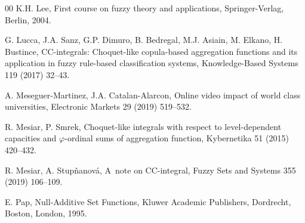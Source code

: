 \documentclass[preprint,11pt]{elsarticle}
\theoremstyle{definition}
\begin{document}
\begin{thebibliography}{00}
 K.H. Lee,  First course on fuzzy theory and applications,  Springer-Verlag, Berlin,  2004.


 G. Lucca, J.A. Sanz, G.P. Dimuro, B. Bedregal, M.J. Asiain, M. Elkano, H. Bustince,  CC-integrals: Choquet-like copula-based aggregation functions and its application in fuzzy rule-based classification systems, Knowledge-Based Systems 119 (2017) 32--43.

 A. Meseguer-Martinez, J.A. Catalan-Alarcon, Online video impact of world class universities, Electronic Markets 29 (2019) 519--532.

 R. Mesiar, P. Smrek, Choquet-like integrals with respect to level-dependent capacities and $\varphi$-ordinal sums of aggregation function, Kybernetika 51 (2015) 420--432.

 R. Mesiar, A. Stup\v{n}anov\'{a},  A~note on CC-integral, Fuzzy Sets and Systems 355 (2019) 106--109.








 E. Pap, Null-Additive Set Functions, Kluwer Academic Publishers, Dordrecht, Boston, London, 1995.


\end{thebibliography}
\end{document}
